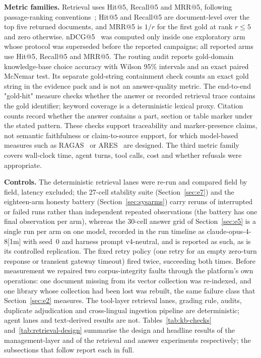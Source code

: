 \textbf{Metric families.} Retrieval uses Hit@5, Recall@5 and MRR@5, following
passage-ranking conventions~\cite{craswell-msmarco-2021}; Hit@5 and Recall@5
are document-level over the top five returned documents, and MRR@5 is $1/r$
for the first gold at rank $r\le 5$ and zero otherwise.
nDCG@5~\cite{jarvelin-cumulated-gain-2002} was computed only inside one
exploratory arm whose protocol was superseded before the reported campaigns;
all reported arms use Hit@5, Recall@5 and MRR@5. The routing audit reports gold-domain
knowledge-base choice accuracy with Wilson 95\% intervals and an exact paired
McNemar test. Its separate gold-string containment check counts an exact gold
string in the evidence pack and is not an answer-quality metric. The end-to-end
"gold-hit" measure checks
whether the answer or recorded retrieval trace contains the gold identifier;
keyword coverage is a deterministic lexical proxy. Citation counts record
whether the answer contains a part, section or table marker under the stated
pattern. These checks support traceability and marker-presence claims, not
semantic faithfulness or claim-to-source support, for which model-based
measures such as RAGAS~\cite{es-ragas-2024} or ARES~\cite{saad-falcon-ares-2024}
are designed. The third metric family covers wall-clock time, agent turns,
tool calls, cost and whether refusals were appropriate.

\textbf{Controls.} The deterministic retrieval lanes were re-run and compared
field by field, latency excluded; the 27-cell stability suite
(Section~\ref{sec:e7}) and the eighteen-arm honesty battery
(Section~\ref{sec:sysarms}) carry reruns of interrupted or failed runs rather
than independent repeated observations (the battery has one final observation
per arm), whereas the 30-cell answer grid of
Section~\ref{sec:e5} is a single run per arm on one model, recorded in the run
timeline as claude-opus-4-8[1m] with seed~0 and harness prompt v4-neutral, and
is reported as such, as is its controlled replication. The fixed retry
policy (one retry for
an empty zero-turn response or transient gateway timeout) fired twice,
succeeding both times. Before measurement we repaired two corpus-integrity
faults through the platform's own operations: one document missing from its
vector collection was re-indexed, and one library whose collection had been
lost was rebuilt, the same failure class that Section~\ref{sec:e2} measures. The tool-layer
retrieval lanes, grading rule, audits, duplicate adjudication and cross-lingual
ingestion pipeline are deterministic; agent lanes and text-derived results are
not. Tables~\ref{tab:kb-checks} and~\ref{tab:retrieval-design} summarise the
design and headline results of the management-layer and of the retrieval and
answer experiments respectively; the subsections that follow report each in
full.

